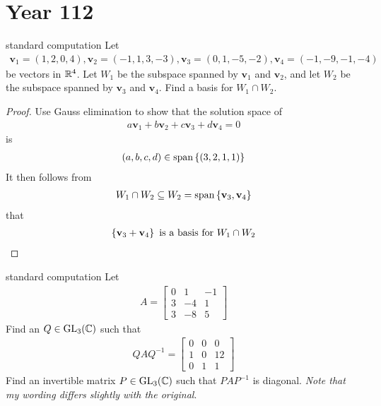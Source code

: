 \documentclass{report}
\begin{document}
\section{Year 112}
\begin{question}{standard computation}{}
Let 
\begin{align*}
\textbf{v}_1= (1,2,0,4),\textbf{v}_2=(-1,1,3,-3),\textbf{v}_3= (0,1,-5,-2),\textbf{v}_4=(-1,-9,-1,-4)
\end{align*}
be vectors in $\mathbb{R}^4$. Let $W_1$ be the subspace spanned by  $\textbf{v}_1$ and $\textbf{v}_2$, and let $W_2$ be the subspace spanned by $\textbf{v}_3$ and $\textbf{v}_4$. Find a basis for $W_1 \cap W_2$. 
\end{question}
\begin{proof}
Use Gauss elimination to show that the solution space of  
\begin{align*}
a\textbf{v}_1 + b \textbf{v}_2 + c \textbf{v}_3 + d \textbf{v}_4 = 0
\end{align*}
is  
\begin{align*}
  (a,b,c,d) \in \operatorname{span}\left\{ (3,2,1,1) \right\}
\end{align*}
It then follows from 
\begin{align*}
W_1 \cap  W_2 \subseteq W_2 =\operatorname{span}\left\{ \textbf{v}_3, \textbf{v}_4 \right\}
\end{align*}
that 
\begin{align*} \left\{ \textbf{v}_3+\textbf{v}_4 \right\}\text{ is a basis for }W_1 \cap W_2
\end{align*}
\end{proof}
\begin{question}{standard computation}{}
Let 
\begin{align*}
A= \begin{bmatrix}
  0 & 1 & -1 \\
  3 & -4 & 1 \\
  3 & -8 & 5 
\end{bmatrix}
\end{align*}
Find an $Q\in \operatorname{GL}_3(\mathbb{C})$ such that 
\begin{align*}
QAQ^{-1}= \begin{bmatrix}
  0 & 0 & 0 \\
  1 & 0 & 12 \\
  0 & 1 & 1
\end{bmatrix}
\end{align*}
Find an invertible matrix $P \in \operatorname{GL}_3(\mathbb{C})$ such that $PAP^{-1}$ is diagonal. \emph{Note that my wording differs slightly with the original}.  
\end{question}
\end{document}
